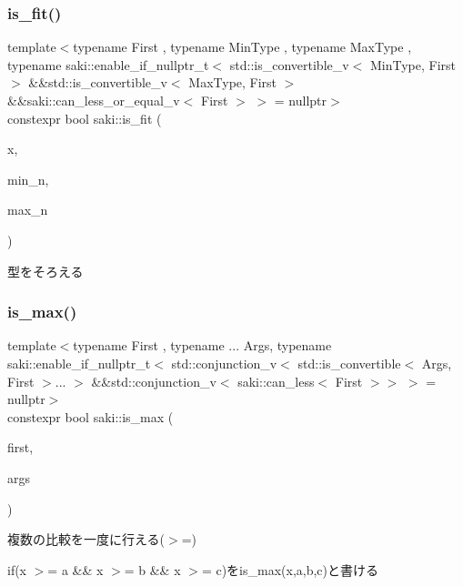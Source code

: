 \subsubsection{\texorpdfstring{is\+\_\+fit()}{is\_fit()}\hspace{0.1cm}{\footnotesize\ttfamily [2/2]}}
{\footnotesize\ttfamily template$<$typename First , typename Min\+Type , typename Max\+Type , typename saki\+::enable\+\_\+if\+\_\+nullptr\+\_\+t$<$ std\+::is\+\_\+convertible\+\_\+v$<$ Min\+Type, First $>$ \&\&std\+::is\+\_\+convertible\+\_\+v$<$ Max\+Type, First $>$ \&\&saki\+::can\+\_\+less\+\_\+or\+\_\+equal\+\_\+v$<$ First $>$ $>$  = nullptr$>$ \\
constexpr bool saki\+::is\+\_\+fit (\begin{DoxyParamCaption}\item[{First}]{x,  }\item[{Min\+Type}]{min\+\_\+n,  }\item[{Max\+Type}]{max\+\_\+n }\end{DoxyParamCaption})}



型をそろえる 

\mbox{\label{namespacesaki_a48b234a435a0e21df1507c4786b975b8}} 
\subsubsection{\texorpdfstring{is\+\_\+max()}{is\_max()}}
{\footnotesize\ttfamily template$<$typename First , typename ... Args, typename saki\+::enable\+\_\+if\+\_\+nullptr\+\_\+t$<$ std\+::conjunction\+\_\+v$<$ std\+::is\+\_\+convertible$<$ Args, First $>$... $>$ \&\&std\+::conjunction\+\_\+v$<$ saki\+::can\+\_\+less$<$ First $>$$>$ $>$  = nullptr$>$ \\
constexpr bool saki\+::is\+\_\+max (\begin{DoxyParamCaption}\item[{const First \&}]{first,  }\item[{const Args \&...}]{args }\end{DoxyParamCaption})}



複数の比較を一度に行える($>$=) 

if(x $>$= a \&\& x $>$= b \&\& x $>$= c)をis\+\_\+max(x,a,b,c)と書ける \mbox{\label{namespacesaki_a7780d542366428c85bfc48fdf43f54ee}} 
